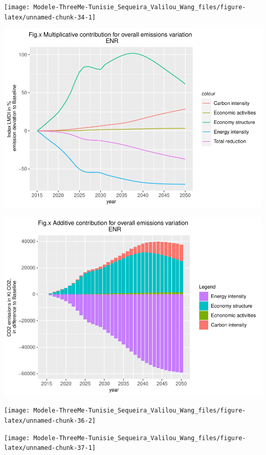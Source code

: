 \documentclass[
]{article}
\begin{document}
\begin{center}\texttt{[image: Modele-ThreeMe-Tunisie\_Sequeira\_Valilou\_Wang\_files/figure-latex/unnamed-chunk-34-1]} \end{center}

\begin{center}\includegraphics[width=0.7\linewidth,height=0.7\textheight]{Modele-ThreeMe-Tunisie_Sequeira_Valilou_Wang_files/figure-latex/unnamed-chunk-35-1} \end{center}

\begin{center}\includegraphics[width=0.7\linewidth,height=0.7\textheight]{Modele-ThreeMe-Tunisie_Sequeira_Valilou_Wang_files/figure-latex/unnamed-chunk-36-1} \end{center}

\begin{center}\texttt{[image: Modele-ThreeMe-Tunisie\_Sequeira\_Valilou\_Wang\_files/figure-latex/unnamed-chunk-36-2]} \end{center}

\begin{center}\texttt{[image: Modele-ThreeMe-Tunisie\_Sequeira\_Valilou\_Wang\_files/figure-latex/unnamed-chunk-37-1]} \end{center}
\end{document}
